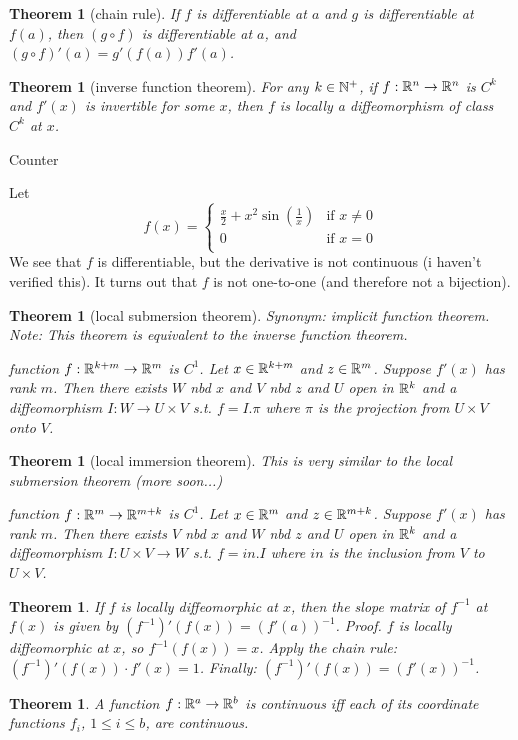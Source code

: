 \documentclass[11pt]{amsbook}
\theoremstyle{mystyle} \newtheorem{thrm}[thm]{Theorem}
\theoremstyle{mystyle} \newtheorem{defi}[thm]{Definition}
\theoremstyle{mystyle} \newtheorem{coro}[thm]{Corollary}
\theoremstyle{mystyle} \newtheorem{propo}[thm]{Proposition}
\theoremstyle{mystyle} \newtheorem{lemm}[thm]{Lemma}
\numberwithin{thm}{section}
\begin{document}
\begin{thrm}[chain rule]
	If $f$ is differentiable at $a$ and $g$ is differentiable at $f(a)$, then $(g \circ f)$ is differentiable at $a$, and $(g \circ f)'(a) = g'(f(a))f'(a)$.
\end{thrm}
\begin{thrm}[inverse function theorem]
	For any $k \in {\mathbb N}^+$, if $f:{\mathbb R}^n \to {\mathbb R}^n$ is $C^k$ and $f'(x)$ is invertible for some $x$, then $f$ is locally a diffeomorphism of class $C^k$ at $x$.
\end{thrm}
\begin{example}
	Counter\end{example}
\begin{example}
	Let $$f(x) =
	\begin{cases}
		\frac{x}{2} + x^2\sin\left(\frac 1x\right)	&\text{if $x \neq 0$} \\
		0											&\text{if $x=0$} \\
	\end{cases}
	$$  We see that $f$ is differentiable, but the derivative is not continuous (i haven't verified this).  It turns out that $f$ is not one-to-one (and therefore not a bijection).
\end{example}
\begin{thrm}[local submersion theorem]
	Synonym: implicit function theorem.
	Note: This theorem is equivalent to the inverse function theorem.

	function $f : {\mathbb R}^{k+m} \to {\mathbb R}^m$ is $C^1$.
	Let $x \in {\mathbb R}^{k+m}$ and $z \in {\mathbb R}^m$.
	Suppose $f'(x)$ has rank $m$.
	Then there exists $W$ nbd $x$ and $V$ nbd $z$ and $U$ open in ${\mathbb R}^k$ and a diffeomorphism $I : W \to U \times V$
	s.t. $f = I.\pi$ where $\pi$ is the projection from $U \times V$ onto $V$.
\end{thrm}
\begin{thrm}[local immersion theorem]
	This is very similar to the local submersion theorem (more soon...)

	function $f : {\mathbb R}^{m} \to {\mathbb R}^{m+k}$ is $C^1$.
	Let $x \in {\mathbb R}^{m}$ and $z \in {\mathbb R}^{m+k}$.
	Suppose $f'(x)$ has rank $m$.
	Then there exists $V$ nbd $x$ and $W$ nbd $z$ and $U$ open in ${\mathbb R}^k$ and a diffeomorphism $I : U \times V \to W$
	s.t. $f = in.I$ where $in$ is the inclusion from $V$ to $U \times V$.
\end{thrm}
\begin{thrm}
	If $f$ is locally diffeomorphic at $x$, then the slope matrix of $f^{-1}$ at $f(x)$ is given by $(f^{-1})'(f(x)) = (f'(a))^{-1}$.
	Proof. $f$ is locally diffeomorphic at $x$, so $f^{-1}(f(x)) = x$.
	Apply the chain rule: $(f^{-1})'(f(x)) \cdot f'(x) = 1$.
	Finally: $(f^{-1})'(f(x)) = (f'(x))^{-1}$.
\end{thrm}
\begin{thrm}
	A function $f : {\mathbb R}^a \to {\mathbb R}^b$ is continuous iff each of its coordinate functions $f_i$, $1\leq i \leq b$, are continuous.
\end{thrm}
\end{document}
